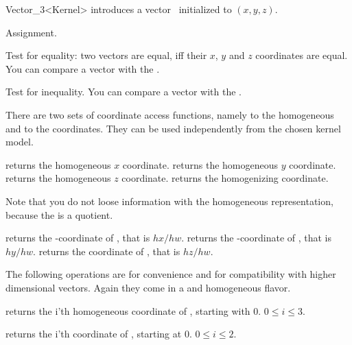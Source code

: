 \begin{ccRefClass} {Vector_3<Kernel>}
            {introduces a vector \ccVar\ initialized to $(x, y, z)$.}


\ccOperations

\ccHidden {}
        {Assignment.}

       {Test for equality: two vectors are equal, iff their $x$, $y$ 
        and $z$ coordinates are equal. You can compare a vector with the
        .}

       {Test for inequality. You can compare a vector with the
        .}

There are two sets of coordinate access functions, namely to the
homogeneous and to the  coordinates. They can be used
independently from the chosen kernel model.

       {returns the homogeneous $x$ coordinate.}
\ccGlue
{}
       {returns the homogeneous $y$ coordinate.}
\ccGlue
{}
       {returns the homogeneous $z$ coordinate.}
\ccGlue
{}
       {returns the homogenizing  coordinate.}

Note that you do not loose information with the homogeneous
representation, because the  is a quotient.

       {returns the -coordinate of \ccVar, that is $hx/hw$.}
\ccGlue
{}
       {returns the -coordinate of \ccVar, that is $hy/hw$.}
\ccGlue
{}
       {returns the  coordinate of \ccVar, that is $hz/hw$.}

The following operations are for convenience and for compatibility
with higher dimensional vectors.  Again they come in a
 and homogeneous flavor.

       {returns the i'th homogeneous coordinate of \ccVar, starting with 0.
        \ccPrecond $0\leq i \leq 3$.}

       {returns the i'th  coordinate of \ccVar, starting at 0.
        \ccPrecond $0\leq i \leq 2$.}


\end{ccRefClass}
